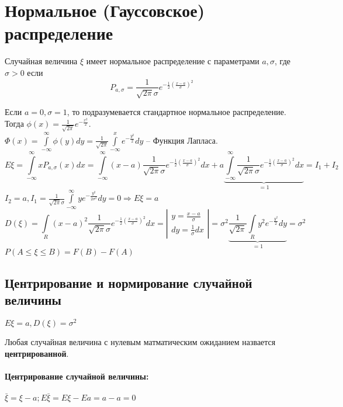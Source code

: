 \section{Нормальное (Гауссовское) распределение}

\begin{definition}
  Случайная величина $\xi$ имеет нормальное распределение с параметрами $a, \sigma$, где $\sigma > 0$ если
  $$P_{a,\sigma}=\frac{1}{\sqrt{2\pi}\sigma}e^{-\frac{1}{2}\left(\frac{x-a}{\sigma}\right)^2}$$
\end{definition}

Если $a=0, \sigma=1$, то подразумевается стандартное нормальное распределение. Тогда $\phi(x)=\frac{1}{\sqrt{2\pi}}e^{-\frac{x^2}{2}}$.\\
$\Phi(x)=\int\limits_{-\infty}^\infty \phi(y)dy=\frac{1}{\sqrt{2\pi}}\int\limits_{-\infty}^x e^{-\frac{y^2}{2}}dy$ -- Функция Лапласа.
$$E\xi = \int\limits_{-\infty}^\infty x P_{a,\sigma}(x)dx = \int\limits_{-\infty}^\infty (x-a)\frac{1}{\sqrt{2\pi}\sigma}e^{-\frac{1}{2}\left(\frac{x-a}{\sigma}\right)^2}dx+a\underbrace{\int\limits_{-\infty}^\infty \frac{1}{\sqrt{2\pi}\sigma}e^{-\frac{1}{2}\left(\frac{x-a}{\sigma}\right)^2}dx}_{=1}=I_1+I_2$$
$I_2 = a, I_1 = \frac{1}{\sqrt{2\pi}\sigma}\int\limits_{-\infty}^\infty y e^{-\frac{y^2}{2\sigma^2}}dy = 0 \Rightarrow E\xi = a$
$$D(\xi) = \int\limits_R (x-a)^2 \frac{1}{\sqrt{2\pi}\sigma}e^{-\frac{1}{2}\left(\frac{x-a}{\sigma}\right)^2}dx = \left|\begin{matrix}y=\frac{x-a}{\sigma}\\dy = \frac{1}{\sigma}dx\end{matrix}\right| = \sigma^2\underbrace{\frac{1}{\sqrt{2\pi}}\int\limits_R y^2 e^{-\frac{y^2}{2}}dy}_{=1} = \sigma^2$$
$P(A\leqslant\xi\leqslant B)=F(B) - F(A)$

\subsection{Центрирование и нормирование случайной величины}
$E\xi = a, D(\xi) = \sigma^2$

\begin{definition}
  Любая случайная величина с нулевым матматическим ожиданием назвается \textbf{центрированной}.
\end{definition}

\paragraph{Центрирование случайной величины:}
$\bar{\xi}=\xi - a; E\bar{\xi} = E\xi - Ea = a - a = 0$

